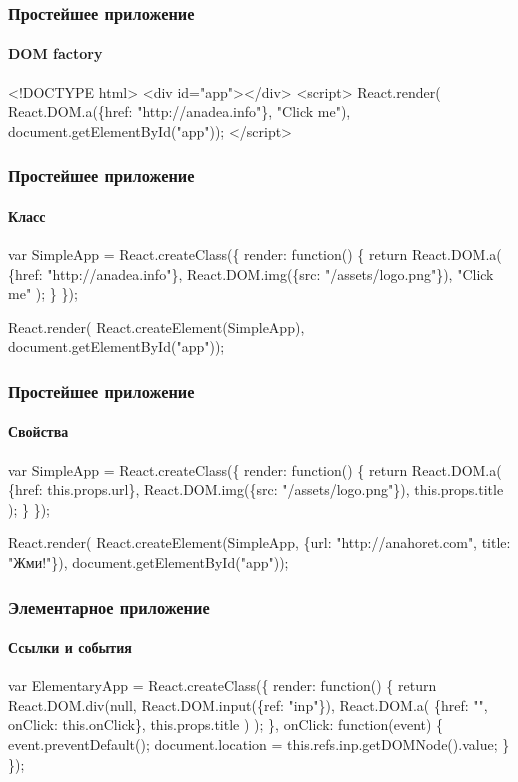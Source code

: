 \documentclass[10pt,utf8]{beamer}
\begin{document}
\begin{frame}[fragile]
  \frametitle{Простейшее приложение}
  \framesubtitle{DOM factory}

  \begin{semiverbatim}
    <!DOCTYPE html>
    <div id="app"\phantom{}></div>
    <script>
    React.render(
      \alert{React.DOM.a}(\{href: "http://anadea.info"\}, "Click me"),
      document.getElementById("app"));
    </script>
  \end{semiverbatim}
\end{frame}

\begin{frame}[fragile]
  \frametitle{Простейшее приложение}
  \framesubtitle{Класс}

  \begin{semiverbatim}
    var SimpleApp = React.createClass(\{
      render: function() \{
        \alert{return React.DOM.a(
          \{href: "http://anadea.info"\},
          React.DOM.img(\{src: "/assets/logo.png"\}),
          "Click me"
        );}
      \}
    \});

    React.render(
      \alert{React.createElement(SimpleApp)},
      document.getElementById("app"));
  \end{semiverbatim}
\end{frame}

\begin{frame}[fragile]
  \frametitle{Простейшее приложение}
  \framesubtitle{Свойства}

  \begin{semiverbatim}
    var SimpleApp = React.createClass(\{
      render: function() \{
        return React.DOM.a(
          \{href: \alert{this.props.url}\},
          React.DOM.img(\{src: "/assets/logo.png"\}),
          \alert{this.props.title}
        );
      \}
    \});

    React.render(
      React.createElement(SimpleApp,
        \alert{\{url: "http://anahoret.com"\phantom{},
         title: "Жми!"\}}),
      document.getElementById("app"));
  \end{semiverbatim}
\end{frame}

\begin{frame}[fragile]
  \frametitle{Элементарное приложение}
  \framesubtitle{Ссылки и события}

  \begin{semiverbatim}
    var ElementaryApp = React.createClass(\{
      render: function() \{
        return React.DOM.div(null,
          React.DOM.input(\{\alert{ref: "inp"}\}),
          React.DOM.a(
            \{href: "\phantom{}"\phantom{}, onClick: \alert{this.onClick}\},
            this.props.title
          )
        );
      \},
      onClick: function(event) \{
        event.preventDefault();
        document.location = \alert{this.refs.inp.getDOMNode()}.value;
      \}
    \});
  \end{semiverbatim}
\end{frame}
\end{document}
